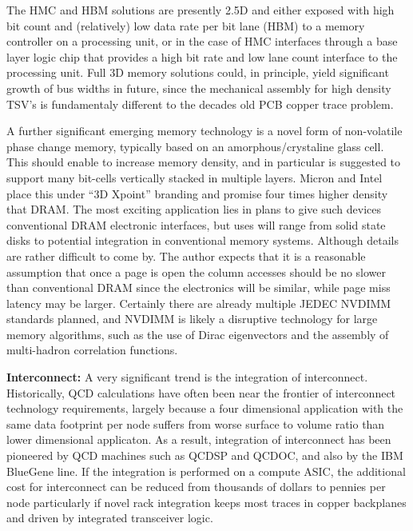 \documentclass{PoS}
\begin{document}
The HMC and HBM solutions are presently 2.5D and either exposed with high bit count and (relatively) low data rate per bit lane 
(HBM) to a memory controller on a processing unit, or in the case of HMC interfaces through a base layer logic chip that 
provides a high bit rate and low lane count interface to the processing unit.
Full 3D memory solutions could, in principle, yield significant growth of bus widths in future, since the mechanical assembly
for high density TSV's is fundamentaly different to the decades old PCB copper trace problem. 

A further significant emerging memory technology is a novel form of non-volatile phase change memory, typically based
on an amorphous/crystaline glass cell. This should enable to increase memory density, and in particular
is suggested to support many bit-cells vertically stacked in multiple layers. Micron and Intel place
this under ``3D Xpoint'' branding and promise four times higher density that DRAM. The most exciting application lies in plans
to give such devices conventional DRAM electronic interfaces, but uses will range from solid state disks to 
potential integration in conventional memory systems. Although details are rather
difficult to come by\cite{WikiPediaXpoint}. The author expects that it is a reasonable assumption that once a page is open the column accesses
should be no slower than conventional DRAM since the electronics will be similar, while page miss latency 
may be larger. Certainly there are 
already multiple JEDEC NVDIMM standards planned, and NVDIMM is likely 
a disruptive technology for large memory algorithms, such as the use of Dirac eigenvectors and the assembly
of multi-hadron correlation functions.

{\bf Interconnect:}
A very significant trend is the integration of interconnect.
Historically, QCD calculations have often been near the frontier of interconnect technology requirements,
largely because a four dimensional application with the same data footprint per node suffers from worse
surface to volume ratio than lower dimensional applicaton. As a result, integration of interconnect has
been pioneered by QCD machines such as QCDSP and QCDOC\cite{QCDSP}, and also by the IBM BlueGene
line\cite{BlueGene}. If the integration is performed on a compute ASIC, the additional cost for interconnect can
be reduced from thousands of dollars to pennies per node particularly if novel rack integration keeps
most traces in copper backplanes and driven by integrated transceiver logic.
\end{document}

